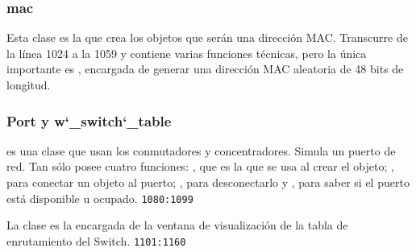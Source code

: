 \documentclass[a4paper, 11pt]{report} %
\begin{document}

\subsubsection{mac}
Esta clase es la que crea los objetos que serán una dirección MAC. Transcurre de la línea 1024 a la 1059 y contiene varias funciones técnicas, pero la única importante es , encargada de generar una dirección MAC aleatoria de 48 bits de longitud.
\subsubsection{Port y w\char`_switch\char`_table}
 es una clase que usan los conmutadores y concentradores. Simula un puerto de red. Tan sólo posee cuatro funciones: , que es la que se usa al crear el objeto; , para conectar un objeto al puerto; , para desconectarlo y , para saber si el puerto está disponible u ocupado. \texttt{1080:1099}

La clase  es la encargada de la ventana de visualización de la tabla de enrutamiento del Switch. \texttt{1101:1160}
\end{document}
